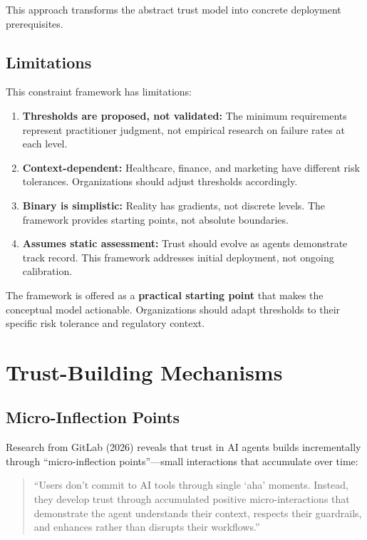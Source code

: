 This approach transforms the abstract trust model into concrete deployment prerequisites.

\subsection{Limitations}
\label{subsec:framework-limitations}

This constraint framework has limitations:

\begin{enumerate}
    \item \textbf{Thresholds are proposed, not validated:} The minimum requirements represent practitioner judgment, not empirical research on failure rates at each level.

    \item \textbf{Context-dependent:} Healthcare, finance, and marketing have different risk tolerances. Organizations should adjust thresholds accordingly.

    \item \textbf{Binary is simplistic:} Reality has gradients, not discrete levels. The framework provides starting points, not absolute boundaries.

    \item \textbf{Assumes static assessment:} Trust should evolve as agents demonstrate track record. This framework addresses initial deployment, not ongoing calibration.
\end{enumerate}

The framework is offered as a \textbf{practical starting point} that makes the conceptual model actionable. Organizations should adapt thresholds to their specific risk tolerance and regulatory context.

\section{Trust-Building Mechanisms}
\label{sec:trust-building}

\subsection{Micro-Inflection Points}
\label{subsec:micro-inflection}

Research from GitLab (2026) reveals that trust in AI agents builds incrementally through ``micro-inflection points''---small interactions that accumulate over time:

\begin{quote}
``Users don't commit to AI tools through single `aha' moments. Instead, they develop trust through accumulated positive micro-interactions that demonstrate the agent understands their context, respects their guardrails, and enhances rather than disrupts their workflows.''
\end{quote}

